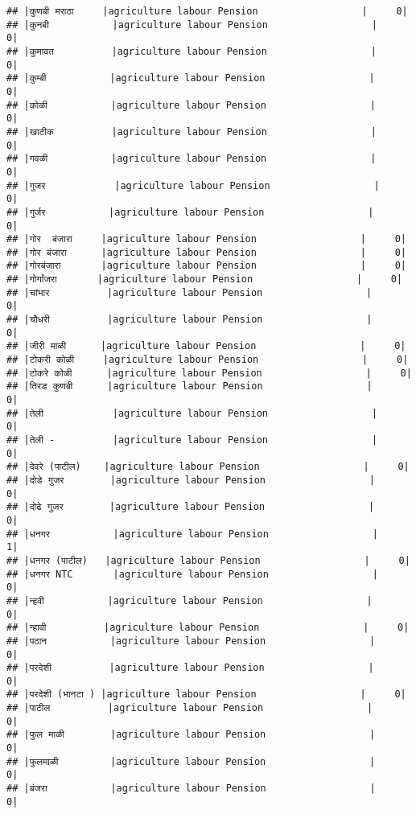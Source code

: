 \documentclass[
]{article}
\begin{document}
\begin{verbatim}
## |कुणबी मराठा     |agriculture labour Pension                  |     0|
## |कुनबी           |agriculture labour Pension                  |     0|
## |कुमावत          |agriculture labour Pension                  |     0|
## |कुम्बी           |agriculture labour Pension                  |     0|
## |कोळी           |agriculture labour Pension                  |     0|
## |खाटीक          |agriculture labour Pension                  |     0|
## |गवळी           |agriculture labour Pension                  |     0|
## |गुजर            |agriculture labour Pension                  |     0|
## |गुर्जर           |agriculture labour Pension                  |     0|
## |गोर  बंजारा     |agriculture labour Pension                  |     0|
## |गोर बंजारा      |agriculture labour Pension                  |     0|
## |गोरबंजारा       |agriculture labour Pension                  |     0|
## |गोर्गांजरा       |agriculture labour Pension                  |     0|
## |चांभार          |agriculture labour Pension                  |     0|
## |चौधरी          |agriculture labour Pension                  |     0|
## |जीरी माळी      |agriculture labour Pension                  |     0|
## |टोकरी कोळी     |agriculture labour Pension                  |     0|
## |टोकरे कोळी      |agriculture labour Pension                  |     0|
## |तिरड कुणबी      |agriculture labour Pension                  |     0|
## |तेली            |agriculture labour Pension                  |     0|
## |तेली -          |agriculture labour Pension                  |     0|
## |देवरे (पाटील)    |agriculture labour Pension                  |     0|
## |दोडे गुजर        |agriculture labour Pension                  |     0|
## |दोढे गुजर        |agriculture labour Pension                  |     0|
## |धनगर           |agriculture labour Pension                  |     1|
## |धनगर (पाटील)   |agriculture labour Pension                  |     0|
## |धनगर NTC       |agriculture labour Pension                  |     0|
## |न्हवी           |agriculture labour Pension                  |     0|
## |न्हावी          |agriculture labour Pension                  |     0|
## |पठान           |agriculture labour Pension                  |     0|
## |परदेशी          |agriculture labour Pension                  |     0|
## |परदेशी (भानटा ) |agriculture labour Pension                  |     0|
## |पाटील          |agriculture labour Pension                  |     0|
## |फुल माळी        |agriculture labour Pension                  |     0|
## |फुलमाळी         |agriculture labour Pension                  |     0|
## |बंजरा           |agriculture labour Pension                  |     0|

\end{verbatim}
\end{document}
